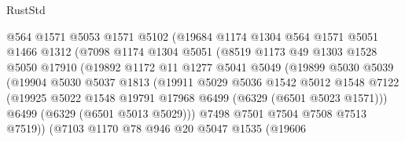 \begin{lexlean}{RustStd}
\begin{coremodule}
{{                        @564
                        @1571
                        @5053
                        @1571
                        @5102
                        (@19684
                          @1174
                          @1304
                          @564
                          @1571
                          @5051
                          @1466
                          @1312
                          (@7098
                            @1174
                            @1304
                            @5051
                            (@8519
                              @1173
                              @49
                              @1303
                              @1528
                              @5050
                              @17910
                              (@19892
                                @1172
                                @11
                                @1277
                                @5041
                                @5049
                                (@19899
                                  @5030
                                  @5039
                                  (@19904
                                    @5030
                                    @5037
                                    @1813
                                    (@19911
                                      @5029
                                      @5036
                                      @1542
                                      @5012
                                      @1548
                                      @7122
                                      (@19925
                                        @5022
                                        @1548
                                        @19791
                                        @17968
                                        @6499
                                        (@6329 (@6501 @5023 @1571)))
                                      @6499
                                      (@6329 (@6501 @5013 @5029)))
                                    @7498
                                    @7501
                                    @7504
                                    @7508
                                    @7513
                                    @7519))
                                (@7103
                                  @1170
                                  @78
                                  @946
                                  @20
                                  @5047
                                  @1535
                                  (@19606
}}
\end{coremodule}
\end{lexlean}
